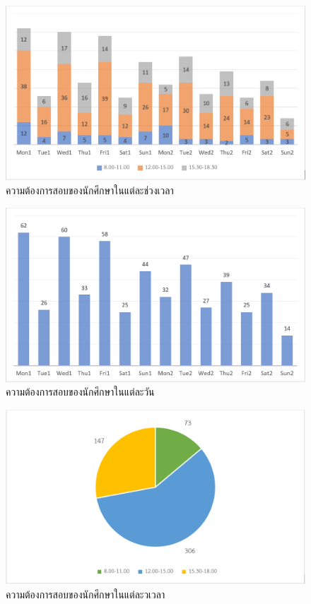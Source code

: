 \begin{figure}
\begin{center}
\includegraphics[width=\linewidth]{images/bar_chart.png}
\end{center}
\caption[Poem]{ความต้องการสอบของนักศึกษาในแต่ละช่วงเวลา}
\label{fig:time_slot}     
\end{figure}

\begin{figure}
\begin{center}
\includegraphics[width=\linewidth]{images/chart.png}
\end{center}
\caption[Poem]{ความต้องการสอบของนักศึกษาในแต่ละวัน}
\label{fig:day}     
\end{figure}

\begin{figure}
\begin{center}
\includegraphics[width=\linewidth]{images/pie.png}
\end{center}
\caption[Poem]{ความต้องการสอบของนักศึกษาในแต่ละวเวลา}
\label{fig:time}     
\end{figure}


